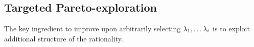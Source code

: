 %

\subsection{Targeted Pareto-exploration}
The key ingredient to improve upon arbitrarily selecting $\lambda_1, \hdots \lambda_i$ is to exploit additional structure of the rationality.  
%
%

